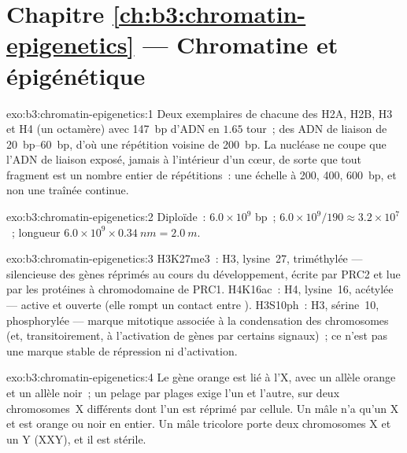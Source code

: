 \section*{Chapitre \ref{ch:b3:chromatin-epigenetics} --- Chromatine et épigénétique}

\begin{solution}{exo:b3:chromatin-epigenetics:1}
Deux exemplaires de chacune des  H2A, H2B, H3 et H4 (un
octamère) avec \qty{147}{bp} d'ADN en $1.65$ tour~; des ADN de liaison
de \qtyrange{20}{60}{bp}, d'où une répétition voisine de \qty{200}{bp}.
La nucléase ne coupe que l'ADN de liaison exposé, jamais à l'intérieur
d'un cœur, de sorte que tout fragment est un nombre entier de
répétitions~: une échelle à \num{200}, \num{400}, \qty{600}{bp}, et non
une traînée continue.
\end{solution}

\begin{solution}{exo:b3:chromatin-epigenetics:2}
Diploïde~: $6.0\times 10^{9}$ bp~; $6.0\times 10^{9}/190 \approx
3.2\times 10^{7}$ ~; longueur $6.0\times 10^{9}\times
\qty{0.34}{nm} = \qty{2.0}{m}$.
\end{solution}

\begin{solution}{exo:b3:chromatin-epigenetics:3}
H3K27me3~:  H3, lysine~27, triméthylée --- 
silencieuse des gènes réprimés au cours du développement, écrite par
PRC2 et lue par les protéines à chromodomaine de PRC1. H4K16ac~: H4,
lysine~16, acétylée ---  active et ouverte (elle rompt un
contact entre ). H3S10ph~: H3, sérine~10, phosphorylée ---
marque mitotique associée à la condensation des chromosomes (et,
transitoirement, à l'activation de gènes par certains signaux)~; ce
n'est pas une marque stable de répression ni d'activation.
\end{solution}

\begin{solution}{exo:b3:chromatin-epigenetics:4}
Le gène orange est lié à l'X, avec un allèle orange et un allèle noir~;
un pelage par plages exige l'un et l'autre, sur deux chromosomes~X
différents dont l'un est réprimé par cellule. Un mâle n'a qu'un X et
est orange ou noir en entier. Un mâle tricolore porte deux chromosomes
X et un Y (XXY), et il est stérile.
\end{solution}

